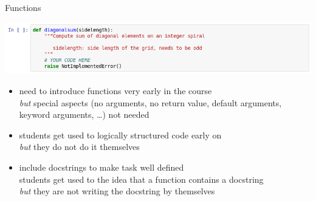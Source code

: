 \documentclass[svgnames]{beamer}
\newcommand\but{\alert{\textit{but}} }
\begin{document}
\begin{frame}{Functions}
 \begin{center}
  \includegraphics[width=\textwidth]{examplecell}
 \end{center}

 \vspace{0.3truecm}
 \begin{itemize}
  \item need to introduce functions very early in the course\\
	\but special aspects (no arguments, no return value, default arguments,
	keyword arguments, \dots) not needed
  \item students get used to logically structured code early on\\
	\but they do not do it themselves
  \item include docstrings to make task well defined\\
	students get used to the idea that a function contains a docstring\\
        \but they are not writing the docstring by themselves
 \end{itemize}
\end{frame}
\end{document}
